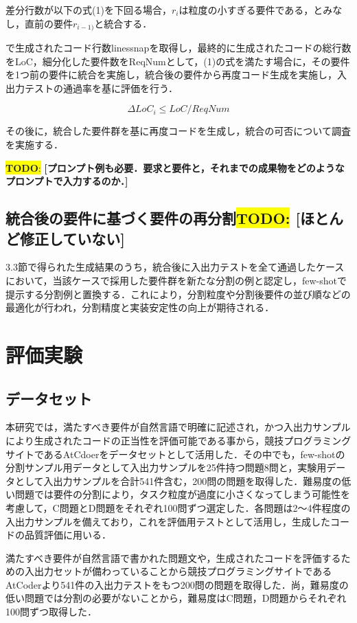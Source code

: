 \documentclass[submit,techrep,noauthor]{ipsj}
\newcommand{\todo}[1]{\colorbox{yellow}{{\bf TODO}:}{\color{red} {\textbf{[#1]}}}}
\begin{document}
差分行数が以下の式(1)を下回る場合，$r_i$は粒度の小すぎる要件である，とみなし，直前の要件$r_{i-1)}$と統合する．

で生成されたコード行数linessnapを取得し，最終的に生成されたコードの総行数をLoC，細分化した要件数をReqNumとして，(1)の式を満たす場合に，その要件を1つ前の要件に統合を実施し，統合後の要件から再度コード生成を実施し，入出力テストの通過率を基に評価を行う．

\begin{equation}
    \Delta LoC_i \leq LoC / ReqNum
\end{equation}

その後に，統合した要件群を基に再度コードを生成し，統合の可否について調査を実施する．

\todo{プロンプト例も必要．要求と要件と，それまでの成果物をどのようなプロンプトで入力するのか．}


\subsection{統合後の要件に基づく要件の再分割\todo{ほとんど修正していない}}
3.3節で得られた生成結果のうち，統合後に入出力テストを全て通過したケースにおいて，当該ケースで採用した要件群を新たな分割の例と認定し，few-shotで提示する分割例と置換する．これにより，分割粒度や分割後要件の並び順などの最適化が行われ，分割精度と実装安定性の向上が期待される．


\section{評価実験}
\label{sec:evaluation}

\subsection{データセット}
本研究では，満たすべき要件が自然言語で明確に記述され，かつ入出力サンプルにより生成されたコードの正当性を評価可能である事から，競技プログラミングサイトであるAtCdoerをデータセットとして活用した．その中でも，few-shotの分割サンプル用データとして入出力サンプルを25件持つ問題8問と，実験用データとして入出力サンプルを合計541件含む，200問の問題を取得した．難易度の低い問題では要件の分割により，タスク粒度が過度に小さくなってしまう可能性を考慮して，C問題とD問題をそれぞれ100問ずつ選定した．各問題は2〜4件程度の入出力サンプルを備えており，これを評価用テストとして活用し，生成したコードの品質評価に用いる．

満たすべき要件が自然言語で書かれた問題文や，生成されたコードを評価するための入出力セットが備わっていることから競技プログラミングサイトであるAtCoder\cite{AtCoder}より541件の入出力テストをもつ200問の問題を取得した．尚，難易度の低い問題では分割の必要がないことから，難易度はC問題，D問題からそれぞれ100問ずつ取得した．
\end{document}
